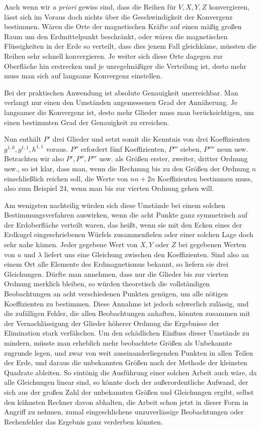 Auch wenn wir \textit{a priori} gewiss sind, dass die Reihen für $V,X,Y,Z$ konvergieren, lässt sich im Voraus doch nichts über die Geschwindigkeit der Konvergenz bestimmen. Wären die Orte der magnetischen Kräfte auf einen mäßig großen Raum um den Erdmittelpunkt beschränkt, oder wären die magnetischen Flüssigkeiten in der Erde so verteilt, dass dies jenem Fall gleichkäme, müssten die Reihen sehr schnell konvergieren. Je weiter sich diese Orte dagegen zur Oberfläche hin erstrecken und je unregelmäßiger die Verteilung ist, desto mehr muss man sich auf langsame Konvergenz einstellen.

Bei der praktischen Anwendung ist absolute Genauigkeit unerreichbar. Man verlangt nur einen den Umständen angemessenen Grad der Annäherung. Je langsamer die Konvergenz ist, desto mehr Glieder muss man berücksichtigen, um einen bestimmten Grad der Genauigkeit zu erreichen.

Nun enthält $P'$ drei Glieder und setzt somit die Kenntnis von drei Koeffizienten $g^{1,0},g^{1,1},h^{1,1}$ voraus. $P''$ erfordert fünf Koeffizienten, $P'''$ sieben, $P''''$ neun usw. Betrachten wir also $P',P'',P'''$ usw. als Größen erster, zweiter, dritter Ordnung usw., so ist klar, dass man, wenn die Rechnung bis zu den Größen der Ordnung $n$ einschließlich reichen soll, die Werte von $nn+2n$ Koeffizienten bestimmen muss, also zum Beispiel 24, wenn man bis zur vierten Ordnung gehen will.

\expandafter\def\csname HistoricalNoteText18\endcsname{Am wenigsten nachteilig würden sich diese Umstände bei einem solchen Bestimmungsverfahren auswirken, wenn die acht Punkte ganz symmetrisch auf der Erdoberfläche verteilt waren, das heißt, wenn sie mit den Ecken eines der Erdkugel eingeschriebenen Würfels zusammenfielen oder einer solchen Lage doch sehr nahe kämen.}
Jeder gegebene Wert von $X,Y$ oder $Z$ bei gegebenen Werten von $u$ und $\lambda$ liefert uns eine Gleichung zwischen den Koeffizienten. Sind also an einem Ort alle Elemente des Erdmagnetismus bekannt, so liefern sie drei Gleichungen. Dürfte man annehmen, dass nur die Glieder bis zur vierten Ordnung merklich bleiben, so würden theoretisch die vollständigen Beobachtungen an acht verschiedenen Punkten genügen, um alle nötigen Koeffizienten zu bestimmen. Diese Annahme ist jedoch schwerlich zulässig, und die zufälligen Fehler, die allen Beobachtungen anhaften, könnten zusammen mit der Vernachlässigung der Glieder höherer Ordnung die Ergebnisse der Elimination stark verfälschen. Um den schädlichen Einfluss dieser Umstände zu mindern, müsste man erheblich mehr beobachtete Größen als Unbekannte zugrunde legen, und zwar von weit auseinanderliegenden Punkten in allen Teilen der Erde, und daraus die unbekannten Größen nach der Methode der kleinsten Quadrate ableiten. So eintönig die Ausführung einer solchen Arbeit auch wäre, da alle Gleichungen linear sind, so könnte doch der außerordentliche Aufwand, der sich aus der großen Zahl der unbekannten Größen und Gleichungen ergibt, selbst den kühnsten Rechner davon abhalten, die Arbeit schon jetzt in dieser Form in Angriff zu nehmen, zumal eingeschlichene unzuverlässige Beobachtungen oder Rechenfehler das Ergebnis ganz verderben könnten.

